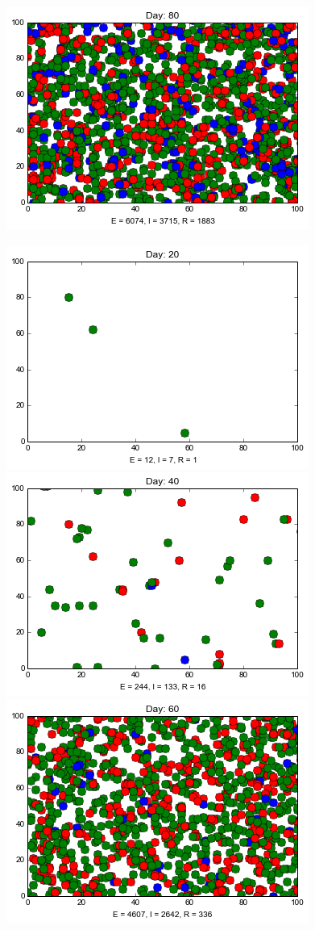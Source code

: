 \begin{minipage}{\linewidth}
\includegraphics[scale=0.28]{images/4t80.png} 

\medskip
\includegraphics[scale=0.28]{images/5t20.png} \quad
\includegraphics[scale=0.28]{images/5t40.png} \quad
\includegraphics[scale=0.28]{images/5t60.png} \quad

\end{minipage}
